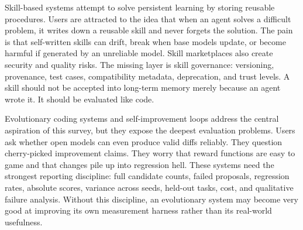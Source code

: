 Skill-based systems attempt to solve persistent learning by storing reusable procedures. Users are attracted to the idea that when an agent solves a difficult problem, it writes down a reusable skill and never forgets the solution. The pain is that self-written skills can drift, break when base models update, or become harmful if generated by an unreliable model. Skill marketplaces also create security and quality risks. The missing layer is skill governance: versioning, provenance, test cases, compatibility metadata, deprecation, and trust levels. A skill should not be accepted into long-term memory merely because an agent wrote it. It should be evaluated like code.

Evolutionary coding systems and self-improvement loops address the central aspiration of this survey, but they expose the deepest evaluation problems. Users ask whether open models can even produce valid diffs reliably. They question cherry-picked improvement claims. They worry that reward functions are easy to game and that changes pile up into regression hell. These systems need the strongest reporting discipline: full candidate counts, failed proposals, regression rates, absolute scores, variance across seeds, held-out tasks, cost, and qualitative failure analysis. Without this discipline, an evolutionary system may become very good at improving its own measurement harness rather than its real-world usefulness.

